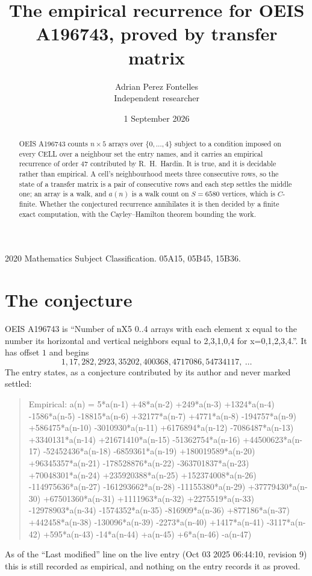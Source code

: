 \documentclass[11pt,a4paper]{article}
\title{The empirical recurrence for OEIS A196743, proved by transfer matrix}
\author{Adrian Perez Fontelles\\ \small Independent researcher}
\date{1 September 2026}
\theoremstyle{plain}
\theoremstyle{definition}
\begin{document}
\maketitle

\begin{abstract}
OEIS A196743 counts $n\times5$ arrays over $\{0,\dots,4\}$ subject to a condition imposed on
every CELL over a neighbour set the entry names, and it carries an empirical recurrence of
order $47$ contributed by R.~H.~Hardin. It is true, and it is decidable rather than
empirical. A cell's neighbourhood meets three consecutive rows, so the state of a transfer
matrix is a pair of consecutive rows and each step settles the middle one; an array is a
walk, and $a(n)$ is a walk count on $S=6580$ vertices, which is $C$-finite. Whether the
conjectured recurrence annihilates it is then decided by a finite exact computation, with the
Cayley--Hamilton theorem bounding the work.
\end{abstract}

\noindent\small 2020 Mathematics Subject Classification. 05A15, 05B45, 15B36.\normalsize

\section{The conjecture}

OEIS A196743 is ``Number of nX5 0..4 arrays with each element x equal to the number its horizontal and vertical neighbors equal to 2,3,1,0,4 for x=0,1,2,3,4.''. It has offset $1$ and begins
\[
1, 17, 282, 2923, 35202, 400368, 4717086, 54734117,\ \dots
\]
The entry states, as a conjecture contributed by its author and never marked settled:
\begin{quote}
Empirical: a(n) = 5*a(n-1) +48*a(n-2) +249*a(n-3) +1324*a(n-4) -1586*a(n-5) -18815*a(n-6) +32177*a(n-7) +4771*a(n-8) -194757*a(n-9) +586475*a(n-10) -3010930*a(n-11) +6176894*a(n-12) -7086487*a(n-13) +3340131*a(n-14) +21671410*a(n-15) -51362754*a(n-16) +44500623*a(n-17) -52452436*a(n-18) -6859361*a(n-19) +180019589*a(n-20) +96345357*a(n-21) -178528876*a(n-22) -363701837*a(n-23) +70048301*a(n-24) +235920388*a(n-25) +152374008*a(n-26) -114975636*a(n-27) -161293662*a(n-28) -11155380*a(n-29) +37779430*a(n-30) +67501360*a(n-31) +1111963*a(n-32) +2275519*a(n-33) -12978903*a(n-34) -1574352*a(n-35) -816909*a(n-36) +877186*a(n-37) +442458*a(n-38) -130096*a(n-39) -2273*a(n-40) +1417*a(n-41) -3117*a(n-42) +595*a(n-43) -14*a(n-44) +a(n-45) +6*a(n-46) -a(n-47)
\end{quote}
As of the ``Last modified'' line on the live entry (Oct 03 2025 06:44:10, revision 9) this is still
recorded as empirical, and nothing on the entry records it as proved.
\end{document}
